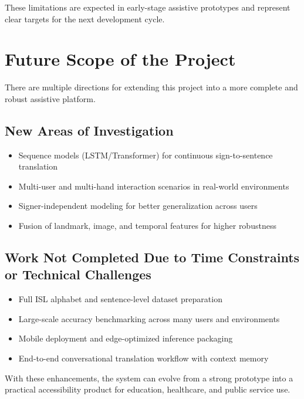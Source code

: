 These limitations are expected in early-stage assistive prototypes and represent clear targets for the next development cycle.

\section{Future Scope of the Project}

There are multiple directions for extending this project into a more complete and robust assistive platform.

\subsection{New Areas of Investigation}

\begin{itemize}
    \item Sequence models (LSTM/Transformer) for continuous sign-to-sentence translation
    \item Multi-user and multi-hand interaction scenarios in real-world environments
    \item Signer-independent modeling for better generalization across users
    \item Fusion of landmark, image, and temporal features for higher robustness
\end{itemize}

\subsection{Work Not Completed Due to Time Constraints or Technical Challenges}

\begin{itemize}
    \item Full ISL alphabet and sentence-level dataset preparation
    \item Large-scale accuracy benchmarking across many users and environments
    \item Mobile deployment and edge-optimized inference packaging
    \item End-to-end conversational translation workflow with context memory
\end{itemize}

With these enhancements, the system can evolve from a strong prototype into a practical accessibility product for education, healthcare, and public service use.
